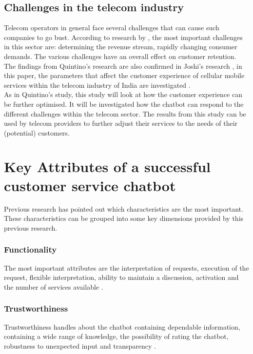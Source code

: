\subsection{Challenges in the telecom industry}
Telecom operators in general face several challenges that can cause such companies to go bust. According to research by \citeauthor{Quintino2019} \citep*{Quintino2019, Malviya2012}, the most important challenges in this sector are: determining the revenue stream, rapidly changing consumer demands. The various challenges have an overall effect on customer retention. The findings from Quintino's research are also confirmed in Joshi's research \citep{Joshi2014}, in this paper, the parameters that affect the customer experience of cellular mobile services within the telecom industry of India are investigated \citep*{Joshi2014, Quintino2019, Malviya2012}.\\
\break
As in Quintino's study, this study will look at how the customer experience can be further optimised. It will be investigated how the chatbot can respond to the different challenges within the telecom sector. The results from this study can be used by telecom providers to further adjust their services to the needs of their (potential) customers.

\section{Key Attributes of a successful customer service chatbot}
Previous research \citep*{Muizzah2021, Verkeyn2018} has pointed out which characteristics are the most important. These characteristics can be grouped into some key dimensions provided by this previous research.\\

\subsubsection{Functionality}
The most important attributes are the interpretation of requests, execution of the request, flexible interpretation, ability to maintain a discussion, activation and the number of services available \citep*{Muizzah2021, Verkeyn2018}.\\

\subsubsection{Trustworthiness}
Trustworthiness handles about the chatbot containing dependable information, containing a wide range of knowledge, the possibility of rating the chatbot, robustness to unexpected input and transparency \citep*{Muizzah2021, Verkeyn2018}.

